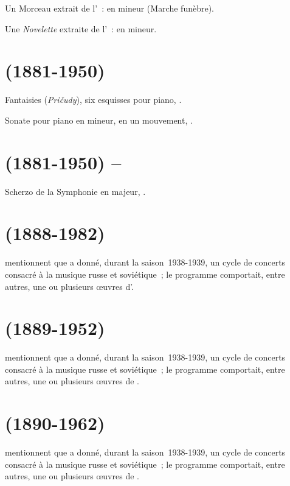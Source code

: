 Un Morceau extrait de l'~:  en \kB mineur (Marche
funèbre).

Une \emph{Novelette} extraite de l'~:  en \kC mineur.

\section[%
Nikolaj Mjaskovskij (1881-1950)]{%
\NMiaskovski{} (1881-1950)}

Fantaisies (\emph{Pričudy}), six esquisses pour piano, .

Sonate pour piano  en \kF \Sharp mineur, en un mouvement,
.

\section[%
Nikolaj Mjaskovskij (1881-1950) -- Anna Aljavdina]{%
\NMiaskovski{} (1881-1950) -- \AAlyavdina{}}

Scherzo de la Symphonie  en \kD majeur, .

\section[%
Anatolij Aleksandrov (1888-1982)]{%
\AAleksandrov{} (1888-1982)}

\citet[p.~413]{Scriabine} mentionnent que \VSofronitsky{} a donné, durant
la saison~1938-1939, un cycle de concerts consacré à la musique russe et
soviétique~; le programme comportait, entre autres, une ou plusieurs œuvres
d'\AAleksandrov{}.

\section[%
Vladimir Ščerbačëv (1889-1952)]{%
\VChtcherbatchiov{} (1889-1952)}

\citet[p.~413]{Scriabine} mentionnent que \VSofronitsky{} a donné, durant
la saison~1938-1939, un cycle de concerts consacré à la musique russe et
soviétique~; le programme comportait, entre autres, une ou plusieurs œuvres
de \VChtcherbatchiov{}.

\section[%
Samuil Fejnberg (1890-1962)]{%
\SFeinberg{} (1890-1962)}

\citet[p.~413]{Scriabine} mentionnent que \VSofronitsky{} a donné, durant
la saison~1938-1939, un cycle de concerts consacré à la musique russe et
soviétique~; le programme comportait, entre autres, une ou plusieurs œuvres
de \SFeinberg{}.


